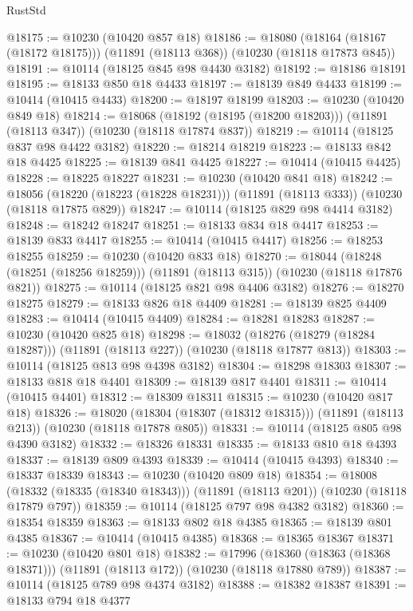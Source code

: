 \begin{lexlean}{RustStd}
\begin{coremodule}
@18175 := @10230 (@10420 @857 @18)
@18186 := @18080
    (@18164 (@18167 (@18172 @18175)))
    (@11891 (@18113 @368))
    (@10230 (@18118 @17873 @845))
@18191 := @10114 (@18125 @845 @98 @4430 @3182)
@18192 := @18186 @18191
@18195 := @18133 @850 @18 @4433
@18197 := @18139 @849 @4433
@18199 := @10414 (@10415 @4433)
@18200 := @18197 @18199
@18203 := @10230 (@10420 @849 @18)
@18214 := @18068
    (@18192 (@18195 (@18200 @18203)))
    (@11891 (@18113 @347))
    (@10230 (@18118 @17874 @837))
@18219 := @10114 (@18125 @837 @98 @4422 @3182)
@18220 := @18214 @18219
@18223 := @18133 @842 @18 @4425
@18225 := @18139 @841 @4425
@18227 := @10414 (@10415 @4425)
@18228 := @18225 @18227
@18231 := @10230 (@10420 @841 @18)
@18242 := @18056
    (@18220 (@18223 (@18228 @18231)))
    (@11891 (@18113 @333))
    (@10230 (@18118 @17875 @829))
@18247 := @10114 (@18125 @829 @98 @4414 @3182)
@18248 := @18242 @18247
@18251 := @18133 @834 @18 @4417
@18253 := @18139 @833 @4417
@18255 := @10414 (@10415 @4417)
@18256 := @18253 @18255
@18259 := @10230 (@10420 @833 @18)
@18270 := @18044
    (@18248 (@18251 (@18256 @18259)))
    (@11891 (@18113 @315))
    (@10230 (@18118 @17876 @821))
@18275 := @10114 (@18125 @821 @98 @4406 @3182)
@18276 := @18270 @18275
@18279 := @18133 @826 @18 @4409
@18281 := @18139 @825 @4409
@18283 := @10414 (@10415 @4409)
@18284 := @18281 @18283
@18287 := @10230 (@10420 @825 @18)
@18298 := @18032
    (@18276 (@18279 (@18284 @18287)))
    (@11891 (@18113 @227))
    (@10230 (@18118 @17877 @813))
@18303 := @10114 (@18125 @813 @98 @4398 @3182)
@18304 := @18298 @18303
@18307 := @18133 @818 @18 @4401
@18309 := @18139 @817 @4401
@18311 := @10414 (@10415 @4401)
@18312 := @18309 @18311
@18315 := @10230 (@10420 @817 @18)
@18326 := @18020
    (@18304 (@18307 (@18312 @18315)))
    (@11891 (@18113 @213))
    (@10230 (@18118 @17878 @805))
@18331 := @10114 (@18125 @805 @98 @4390 @3182)
@18332 := @18326 @18331
@18335 := @18133 @810 @18 @4393
@18337 := @18139 @809 @4393
@18339 := @10414 (@10415 @4393)
@18340 := @18337 @18339
@18343 := @10230 (@10420 @809 @18)
@18354 := @18008
    (@18332 (@18335 (@18340 @18343)))
    (@11891 (@18113 @201))
    (@10230 (@18118 @17879 @797))
@18359 := @10114 (@18125 @797 @98 @4382 @3182)
@18360 := @18354 @18359
@18363 := @18133 @802 @18 @4385
@18365 := @18139 @801 @4385
@18367 := @10414 (@10415 @4385)
@18368 := @18365 @18367
@18371 := @10230 (@10420 @801 @18)
@18382 := @17996
    (@18360 (@18363 (@18368 @18371)))
    (@11891 (@18113 @172))
    (@10230 (@18118 @17880 @789))
@18387 := @10114 (@18125 @789 @98 @4374 @3182)
@18388 := @18382 @18387
@18391 := @18133 @794 @18 @4377

\end{coremodule}
\end{lexlean}
